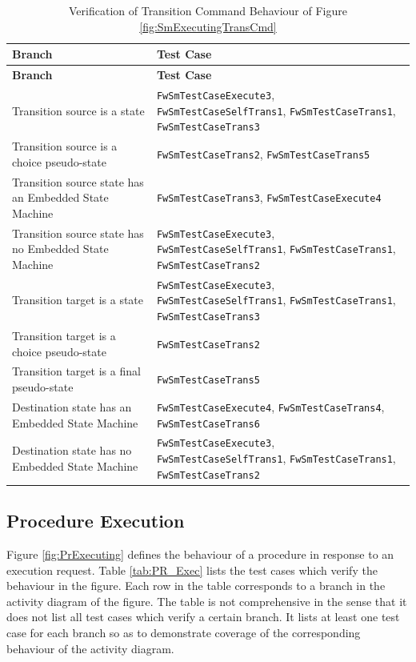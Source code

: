 \documentclass[requirements]{../fwprofile}
\begin{document}
\begin{longtable}{|p{6.7cm}|p{4.5cm}|}
\caption{Verification of Transition Command Behaviour of Figure \ref{fig:SmExecutingTransCmd}}
\label{tab:SM_Trans_Exec} \\
\hline
\rowcolor{gray}
\textbf{Branch} & \textbf{Test Case} \\
\hline
\endfirsthead
\rowcolor{gray}
\textbf{Branch} & \textbf{Test Case} \\
\hline
\endhead
Transition source is a state & \texttt{FwSmTestCaseExecute3}, \texttt{FwSmTestCaseSelfTrans1}, \texttt{FwSmTestCaseTrans1}, \texttt{FwSmTestCaseTrans3} \\
\hline
Transition source is a choice pseudo-state & \texttt{FwSmTestCaseTrans2}, \texttt{FwSmTestCaseTrans5} \\
\hline
Transition source state has an Embedded State Machine & \texttt{FwSmTestCaseTrans3}, \texttt{FwSmTestCaseExecute4} \\
\hline
Transition source state has no Embedded State Machine & \texttt{FwSmTestCaseExecute3}, \texttt{FwSmTestCaseSelfTrans1}, \texttt{FwSmTestCaseTrans1}, 
\texttt{FwSmTestCaseTrans2} \\
\hline
Transition target is a state & \texttt{FwSmTestCaseExecute3}, \texttt{FwSmTestCaseSelfTrans1}, \texttt{FwSmTestCaseTrans1}, \texttt{FwSmTestCaseTrans3} \\
\hline
Transition target is a choice pseudo-state & \texttt{FwSmTestCaseTrans2} \\
\hline
Transition target is a final pseudo-state & \texttt{FwSmTestCaseTrans5} \\
\hline
Destination state has an Embedded State Machine & \texttt{FwSmTestCaseExecute4}, \texttt{FwSmTestCaseTrans4}, \texttt{FwSmTestCaseTrans6} \\
\hline
Destination state has no Embedded State Machine & \texttt{FwSmTestCaseExecute3}, \texttt{FwSmTestCaseSelfTrans1}, \texttt{FwSmTestCaseTrans1}, 
\texttt{FwSmTestCaseTrans2} \\
\hline
\end{longtable}

\subsection{Procedure Execution}\label{Appendix_D_PR_Exec}
Figure \ref{fig:PrExecuting} defines the behaviour of a procedure in response to an 
execution request. 
Table \ref{tab:PR_Exec} lists the test cases which verify the behaviour in the figure. 
Each row in the table corresponds to a branch in the activity diagram of the figure. 
The table is not comprehensive in the sense that it does not list all test cases which 
verify a certain branch. 
It lists at least one test case for each branch so as to demonstrate coverage of 
the corresponding behaviour of the activity diagram.
\end{document}
